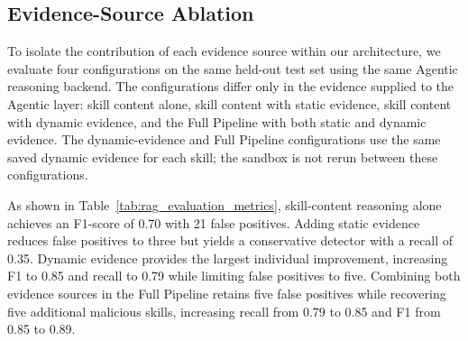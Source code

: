 \subsection{Evidence-Source Ablation}
\label{sec:rq2-ablation}
To isolate the contribution of each evidence source
within our architecture, we evaluate four configurations
on the same held-out test set using the same Agentic
reasoning backend. The configurations differ only
in the evidence supplied to the Agentic layer:
skill content alone, skill content with static evidence,
skill content with dynamic evidence, and the Full
Pipeline with both static and dynamic evidence.
The dynamic-evidence and Full Pipeline configurations
use the same saved dynamic evidence for each skill;
the sandbox is not rerun between these configurations.

As shown in Table~\ref{tab:rag_evaluation_metrics}, skill-content
reasoning alone achieves an F1-score of 0.70 with 21 false positives.
Adding static evidence reduces false positives to three but yields a
conservative detector with a recall of 0.35. Dynamic evidence provides
the largest individual improvement, increasing F1 to 0.85 and recall
to 0.79 while limiting false positives to five. Combining both
evidence sources in the Full Pipeline retains five false positives
while recovering five additional malicious skills, increasing recall
from 0.79 to 0.85 and F1 from 0.85 to 0.89.



